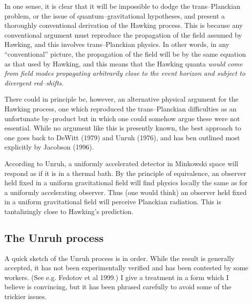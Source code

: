 In one sense, it is clear that it will be impossible to dodge the
trans--Planckian problem, or the issue of quantum--gravitational hypotheses,
and present a thoroughly conventional derivation of the Hawking process.  This
is because any conventional argument must reproduce the propagation of the
field assumed by Hawking, and this involves trans--Planckian physics.  In other
words, in any ``conventional'' picture, the propagation of the field will be by
the same equation as that used by Hawking, and this means that the  Hawking
quanta \it would \rm come from field modes propagating arbitrarily close to the
event horizon and subject to divergent red--shifts.  

There could in principle be, however, an alternative physical argument for the
Hawking process, one which reproduced the trans--Planckian difficulties as an
unfortunate by--product but in which one could somehow argue these were not
essential.  While no argument like this is presently known, the best approach
to one goes back to DeWitt (1979) and Unruh (1976), and has ben
outlined most explicitly by Jacobson (1996).

According to Unruh, a uniformly accelerated detector in Minkowski space will
respond as if it is in a thermal bath.  By the principle of equivalence, an
observer held fixed in a uniform gravitational field will find physics locally
the same as for a uniformly accelerating observer.  Thus (one would think) an
observer held fixed in a uniform gravitational field will perceive Planckian
radiation.  This is tantalizingly close to Hawking's prediction.  

\subsection{The Unruh process}

A quick sketch of the Unruh process is in order. While the result is generally
accepted, it has not been experimentally verified and has been contested by
some workers.  (See e.g. Fedotov et al 1999.)  I give a treatment in a form
which I believe is convincing, but it has been phrased carefully to avoid some
of the trickier issues.

